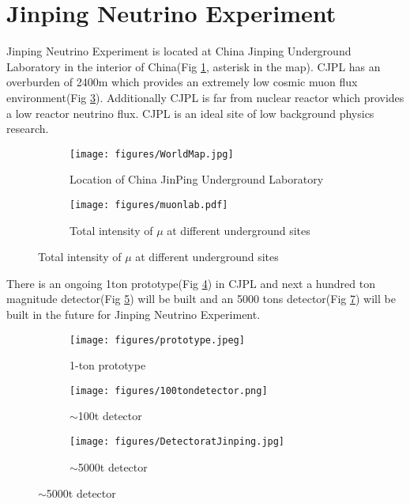 \section{Jinping Neutrino Experiment} %
Jinping Neutrino Experiment is located at China Jinping Underground Laboratory in the interior of China(Fig \ref{fig:cjpl}, asterisk in the map). CJPL has an overburden of 2400m which provides an extremely low cosmic muon flux environment(Fig \ref{fig:muon}). Additionally CJPL is far from nuclear reactor which provides a low reactor neutrino flux. CJPL is an ideal site of low background physics research. 

\begin{figure}[H]
\begin{minipage}{.4\textwidth}
\begin{figure}[H]
    \centering
        \texttt{[image: figures/WorldMap.jpg]}
    \caption{Location of China JinPing Underground Laboratory}
    \label{fig:cjpl}
\end{figure}
\end{minipage}
\begin{minipage}{.6\textwidth}
\begin{figure}[H]
    \centering
        \texttt{[image: figures/muonlab.pdf]}
    \caption{Total intensity of $\mu$ at different underground sites}
    \label{fig:muon}
\end{figure}
\end{minipage}
\end{figure}

There is an ongoing 1ton prototype(Fig \ref{fig:1t}) in CJPL and next a hundred ton magnitude detector(Fig \ref{fig:100t}) will be built and an 5000 tons detector(Fig \ref{fig:1kt}) will be built in the future for Jinping Neutrino Experiment. 

\begin{figure}[H]
\begin{minipage}{.33\textwidth}
\begin{figure}[H]
    \centering
    \caption{1-ton prototype}
    \texttt{[image: figures/prototype.jpeg]}
    \label{fig:1t}
\end{figure}
\end{minipage}
\begin{minipage}{.34\textwidth}
\begin{figure}[H]
    \centering
    \caption{$\sim$100t detector}
    \texttt{[image: figures/100tondetector.png]}
    \label{fig:100t}
\end{figure}
\end{minipage}
\begin{minipage}{.33\textwidth}
\begin{figure}[H]
    \centering
    \caption{$\sim$5000t detector}
    \texttt{[image: figures/DetectoratJinping.jpg]}
    \label{fig:1kt}
\end{figure}
\end{minipage}
\end{figure}

